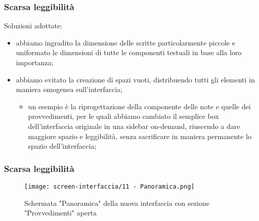 \begin{frame}
    \label{f:scarsa-leggibilita}
    \frametitle{Scarsa leggibilità}    
    Soluzioni adottate: 
    \begin{itemize}
        \item<1-> abbiamo ingradito la dimensione delle scritte particolarmente piccole e uniformato le dimensioni di tutte le componenti testuali in base alla loro importanza;
        \item<2-> abbiamo evitato la creazione di spazi vuoti, distribuendo tutti gli elementi in maniera omogenea sull'interfaccia;
        \begin{itemize}
            \item<2-> un esempio è la riprogettazione della componente delle note e quelle dei provvedimenti, per le quali abbiamo cambiato il semplice box dell'interfaccia originale in una sidebar on-demand, riuscendo a dare maggiore spazio e leggibilità, senza sacrificare in maniera permanente lo spazio dell'interfaccia;
        \end{itemize}
    \end{itemize}    

\end{frame}

\begin{frame}
    \frametitle{Scarsa leggibilità}
    \begin{figure}
        \centering
        \texttt{[image: screen-interfaccia/11 - Panoramica.png]}
        \caption{Schermata "Panoramica" della nuova interfaccia con sezione "Provvedimenti" aperta}
    \end{figure}
\end{frame}

